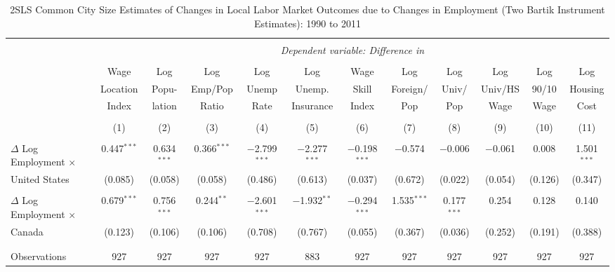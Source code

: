 

\begin{sidewaystable}[!htbp] \centering 
  \caption{2SLS Common City Size Estimates of Changes in Local Labor Market Outcomes due to Changes in Employment (Two Bartik Instrument Estimates): 1990 to 2011} 
  \label{tab:bartik_2sls_common} 
\small
\begin{threeparttable}
\begin{tabular}{@{\extracolsep{5pt}}lccccccccccc} 
\\[-1.8ex]\hline 
\hline \\[-1.8ex] 
 & \multicolumn{11}{c}{\textit{Dependent variable: Difference in }} \\ 
\cline{2-12} 
\\[-2.0ex]
 & Wage & Log & Log & Log & Log & Wage & Log & Log & Log & Log & Log \\
 & Location & Popu- & Emp/Pop & Unemp & Unemp. & Skill & Foreign/ & Univ/ & Univ/HS & 90/10 & Housing \\
 & Index & lation & Ratio & Rate & Insurance & Index & Pop & Pop & Wage & Wage & Cost \\
\\[-1.8ex] & (1) & (2) & (3) & (4) & (5) & (6) & (7) & (8) & (9) & (10) & (11)\\ 
\hline \\[-1.8ex] 
 $\Delta$ Log Employment $\times$ & 0.447$^{***}$ & 0.634$^{***}$ & 0.366$^{***}$ & $-$2.799$^{***}$ & $-$2.277$^{***}$ & $-$0.198$^{***}$ & $-$0.574 & $-$0.006 & $-$0.061 & 0.008 & 1.501$^{***}$ \\ 
United States  & (0.085) & (0.058) & (0.058) & (0.486) & (0.613) & (0.037) & (0.672) & (0.022) & (0.054) & (0.126) & (0.347) \\ 
  & & & & & & & & & & & \\ 
 $\Delta$ Log Employment $\times$ & 0.679$^{***}$ & 0.756$^{***}$ & 0.244$^{**}$ & $-$2.601$^{***}$ & $-$1.932$^{**}$ & $-$0.294$^{***}$ & 1.535$^{***}$ & 0.177$^{***}$ & 0.254 & 0.128 & 0.140 \\ 
Canada  & (0.123) & (0.106) & (0.106) & (0.708) & (0.767) & (0.055) & (0.367) & (0.036) & (0.252) & (0.191) & (0.388) \\ 
  & & & & & & & & & & & \\ 
\hline \\[-1.8ex] 
Observations & 927 & 927 & 927 & 927 & 883 & 927 & 927 & 927 & 927 & 927 & 927 \\ 

\end{tabular}
\end{threeparttable}
\end{sidewaystable}
